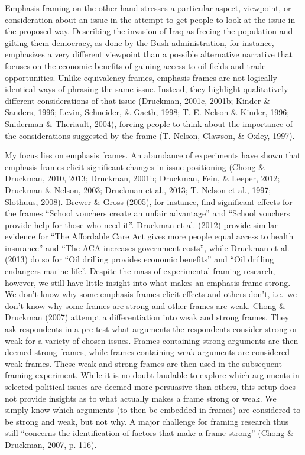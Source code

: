 \documentclass[12pt,econ]{sources/authesis}
\begin{document}
Emphasis framing on the other hand stresses a particular aspect, viewpoint, or consideration about an issue in the attempt to get people to look at the issue in the proposed way. Describing the invasion of Iraq as freeing the population and gifting them democracy, as done by the Bush administration, for instance, emphasizes a very different viewpoint than a possible alternative narrative that focuses on the economic benefits of gaining access to oil fields and trade opportunities. Unlike equivalency frames, emphasis frames are not logically identical ways of phrasing the same issue. Instead, they highlight qualitatively different considerations of that issue (Druckman, 2001c, 2001b; Kinder \& Sanders, 1996; Levin, Schneider, \& Gaeth, 1998; T. E. Nelson \& Kinder, 1996; Sniderman \& Theriault, 2004), forcing people to think about the importance of the considerations suggested by the frame (T. Nelson, Clawson, \& Oxley, 1997).

My focus lies on emphasis frames. An abundance of experiments have shown that emphasis frames elicit significant changes in issue positioning (Chong \& Druckman, 2010, 2013; Druckman, 2001b; Druckman, Fein, \& Leeper, 2012; Druckman \& Nelson, 2003; Druckman et al., 2013; T. Nelson et al., 1997; Slothuus, 2008). Brewer \& Gross (2005), for instance, find significant effects for the frames ``School vouchers create an unfair advantage'' and ``School vouchers provide help for those who need it''. Druckman et al. (2012) provide similar evidence for ``The Affordable Care Act gives more people equal access to health insurance'' and ``The ACA increases government costs'', while Druckman et al. (2013) do so for ``Oil drilling provides economic benefits'' and ``Oil drilling endangers marine life''. Despite the mass of experimental framing research, however, we still have little insight into what makes an emphasis frame strong. We don't know why some emphasis frames elicit effects and others don't, i.e.~we don't know why some frames are strong and other frames are weak. Chong \& Druckman (2007) attempt a differentiation into weak and strong frames. They ask respondents in a pre-test what arguments the respondents consider strong or weak for a variety of chosen issues. Frames containing strong arguments are then deemed strong frames, while frames containing weak arguments are considered weak frames. These weak and strong frames are then used in the subsequent framing experiment. While it is no doubt laudable to explore which arguments in selected political issues are deemed more persuasive than others, this setup does not provide insights as to what actually makes a frame strong or weak. We simply know which arguments (to then be embedded in frames) are considered to be strong and weak, but not why. A major challenge for framing research thus still ``concerns the identification of factors that make a frame strong'' (Chong \& Druckman, 2007, p. 116).
\end{document}

